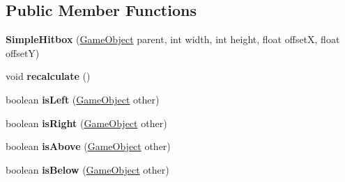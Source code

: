 \subsection*{Public Member Functions}
\begin{DoxyCompactItemize}
\item 
\mbox{\label{classde_1_1me_1_1edgelord_1_1sjgl_1_1hitbox_1_1_simple_hitbox_a7b31cd86c90e7b761f17af052eeee8c0}} 
{\bfseries Simple\+Hitbox} (\mbox{\hyperlink{classde_1_1me_1_1edgelord_1_1sjgl_1_1gameobject_1_1_game_object}{Game\+Object}} parent, int width, int height, float offsetX, float offsetY)
\item 
\mbox{\label{classde_1_1me_1_1edgelord_1_1sjgl_1_1hitbox_1_1_simple_hitbox_a53627dcd4b3946bd2d687d9ebd9ce816}} 
void {\bfseries recalculate} ()
\item 
\mbox{\label{classde_1_1me_1_1edgelord_1_1sjgl_1_1hitbox_1_1_simple_hitbox_a360a83097f1b38b63a98df7fd0a6b8fe}} 
boolean {\bfseries is\+Left} (\mbox{\hyperlink{classde_1_1me_1_1edgelord_1_1sjgl_1_1gameobject_1_1_game_object}{Game\+Object}} other)
\item 
\mbox{\label{classde_1_1me_1_1edgelord_1_1sjgl_1_1hitbox_1_1_simple_hitbox_a21c87ee9b9bb8989d29d5a8a58d635a6}} 
boolean {\bfseries is\+Right} (\mbox{\hyperlink{classde_1_1me_1_1edgelord_1_1sjgl_1_1gameobject_1_1_game_object}{Game\+Object}} other)
\item 
\mbox{\label{classde_1_1me_1_1edgelord_1_1sjgl_1_1hitbox_1_1_simple_hitbox_a8c75711cacc0524edcdd07dd797777e5}} 
boolean {\bfseries is\+Above} (\mbox{\hyperlink{classde_1_1me_1_1edgelord_1_1sjgl_1_1gameobject_1_1_game_object}{Game\+Object}} other)
\item 
\mbox{\label{classde_1_1me_1_1edgelord_1_1sjgl_1_1hitbox_1_1_simple_hitbox_abe3fd35889f70f7a003d5d04c7c1e1a4}} 
boolean {\bfseries is\+Below} (\mbox{\hyperlink{classde_1_1me_1_1edgelord_1_1sjgl_1_1gameobject_1_1_game_object}{Game\+Object}} other)

\end{DoxyCompactItemize}
